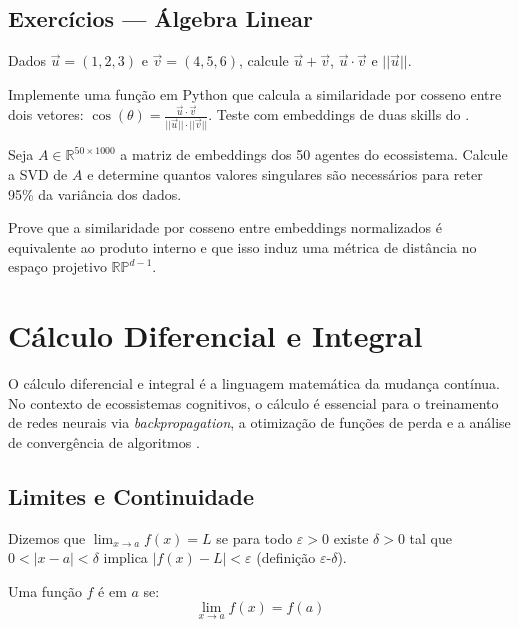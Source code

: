 \subsection{Exercícios — Álgebra Linear}
\begin{exercicio}
Dados $\vec{u} = (1, 2, 3)$ e $\vec{v} = (4, 5, 6)$, calcule
$\vec{u} + \vec{v}$, $\vec{u} \cdot \vec{v}$ e $||\vec{u}||$.
\end{exercicio}
\begin{exercicio}
Implemente uma função em Python que calcula a similaridade por cosseno
entre dois vetores: $\cos(\theta) = \frac{\vec{u} \cdot \vec{v}}
{||\vec{u}|| \cdot ||\vec{v}||}$. Teste com embeddings de duas skills
do \opencodeeco{}.
\end{exercicio}
\begin{exercicio}
Seja $A \in \mathbb{R}^{50 \times 1000}$ a matriz de embeddings dos 50
agentes do ecossistema. Calcule a SVD de $A$ e determine quantos valores
singulares são necessários para reter 95\% da variância dos dados.
\end{exercicio}
\begin{exercicio}
Prove que a similaridade por cosseno entre embeddings normalizados é
equivalente ao produto interno e que isso induz uma métrica de distância
no espaço projetivo $\mathbb{RP}^{d-1}$.
\end{exercicio}
\section{Cálculo Diferencial e Integral}
\label{sec:calculo}
\nivelintermediario
O cálculo diferencial e integral é a linguagem matemática da mudança
contínua. No contexto de ecossistemas cognitivos, o cálculo é essencial para
o treinamento de redes neurais via \textit{backpropagation}, a otimização de
funções de perda e a análise de convergência de algoritmos
\cite{goodfellow2016deep, bishop2006pattern}.
\subsection{Limites e Continuidade}
\begin{definicao}
Dizemos que $\lim_{x \to a} f(x) = L$ se para todo $\varepsilon > 0$
existe $\delta > 0$ tal que $0 < |x - a| < \delta$ implica
$|f(x) - L| < \varepsilon$ (definição $\varepsilon$-$\delta$).
\end{definicao}
\begin{definicao}[Continuidade]
Uma função $f$ é  em $a$ se:
\[\lim_{x \to a} f(x) = f(a)
\]
\end{definicao}
